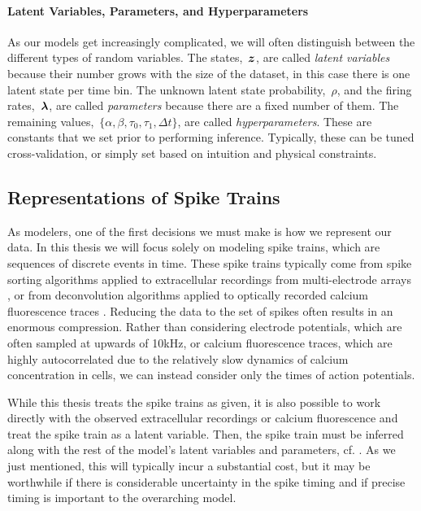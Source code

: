 \paragraph{Latent Variables, Parameters, and Hyperparameters}
As our models get increasingly complicated, 
we will often distinguish between the different types of random
variables. The states,~$\boldsymbol{z}$, are called \emph{latent
  variables} because their number grows with the size of the dataset,
in this case there is one latent state per time bin. The unknown latent state
probability,~$\rho$, and the firing rates,~$\boldsymbol{\lambda}$, are called
\emph{parameters} because there are a fixed number of them. The
remaining values,~${\{ \alpha, \beta, \tau_0, \tau_1, \Delta t \} }$,
are called \emph{hyperparameters}. These are constants that we set
prior to performing inference.  Typically, these can be tuned
cross-validation, or simply set based on intuition and physical
constraints.

\subsection{Representations of Spike Trains}
As modelers, one of the first decisions we must make is how we
represent our data. In this thesis we will focus solely on modeling
spike trains, which are sequences of discrete events in time. These
spike trains typically come from spike sorting algorithms applied to
extracellular recordings from multi-electrode arrays
\cite{lewicki1998review}, or from
deconvolution algorithms applied to optically recorded calcium
fluorescence traces \cite{pnevmatikakis2016simultaneous,
  vogelstein2010fast}. Reducing the data to the set of spikes often 
results in an enormous compression. Rather than considering electrode 
potentials, which are often sampled at upwards of 10kHz, or calcium 
fluorescence traces, which are highly autocorrelated due to the relatively 
slow dynamics of calcium concentration in cells, we can instead consider 
only the times of action potentials.

While this thesis treats the spike trains as given, it is also possible to
work directly with the observed extracellular recordings or calcium
fluorescence and treat the spike train as a latent variable.  Then,
the spike train must be inferred along with the rest of the model's
latent variables and parameters, cf. \cite{pillow2013model}. As we just 
mentioned, this will typically incur a substantial cost, but it may be 
worthwhile if there is considerable uncertainty in the spike timing 
and if precise timing is important to the overarching model.

